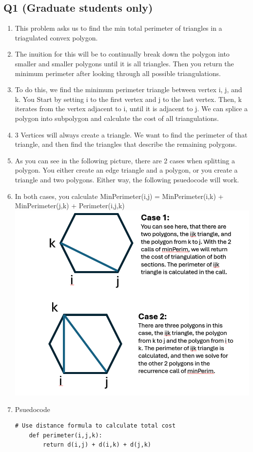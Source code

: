 \documentclass{article}
\begin{document}
\subsection*{Q1 (Graduate students only)}
\begin{enumerate}[label=(\alph*)]
    \item This problem asks us to find the min total perimeter of triangles in a triagulated convex polygon.
    \item The inuition for this will be to continually break down the polygon into smaller and smaller polygons until it is all triangles. Then you return the minimum perimeter after looking through all possible triangulations. 
    \item To do this, we find the minimum perimeter triangle between vertex i, j, and k. You Start by setting i to the first vertex and j to the last vertex. Then, k iterates from the vertex adjacent to i, until it is adjacent to j. We can splice a polygon into subpolygon and calculate the cost of all triangulations.
    \item 3 Vertices will always create a triangle. We want to find the perimeter of that triangle, and then find the triangles that describe the remaining polygons.
    \item As you can see in the following picture, there are 2 cases when splitting a polygon. You either create an edge triangle and a polygon, or you create a triangle and two polygons. Either way, the following psuedocode will work.
    \item In both cases, you calculate MinPerimeter(i,j) = MinPerimeter(i,k) + MinPerimeter(j,k) + Perimeter(i,j,k)
    \subitem \includegraphics[width=1\textwidth]{polygon.png}
    \item Psuedocode
    \begin{lstlisting}[frame=single]
    # Use distance formula to calculate total cost
    def perimeter(i,j,k):
        return d(i,j) + d(i,k) + d(j,k)
    

\end{lstlisting}
\end{enumerate}
\end{document}
